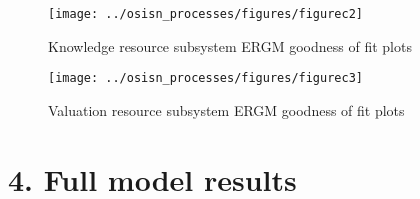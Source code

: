 \documentclass[twoside,12pt,final]{ucthesis-CA2012}
\begin{document}
\begin{ucmainmatter}
\begin{figure}
{\centering \texttt{[image: ../osisn\_processes/figures/figurec2]} 

}

\caption{Knowledge resource subsystem ERGM goodness of fit plots}\label{fig:unnamed-chunk-31}
\end{figure}
\begin{figure}

{\centering \texttt{[image: ../osisn\_processes/figures/figurec3]} 

}

\caption{Valuation resource subsystem ERGM goodness of fit plots}\label{fig:unnamed-chunk-32}
\end{figure}
\hypertarget{full-model-results-1}{%
\section{4. Full model results}\label{full-model-results-1}}
\begin{table}


\end{table}
\end{ucmainmatter}
\end{document}
